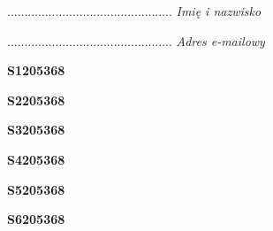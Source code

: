 \begin{turn}{90}\begin{minipage}{\linewidth} \vspace{20mm} ................................................  \textit{Imię i nazwisko}\end{minipage}\end{turn}

\begin{turn}{90}\begin{minipage}{\linewidth} \vspace{20mm} ................................................  \textit{Adres e-mailowy}\end{minipage}\end{turn}

\begin{turn}{90}\huge \begin{minipage}{\linewidth} \vspace{10mm}\textbf{S1205368}\end{minipage}\end{turn}

\begin{turn}{90}\huge \begin{minipage}{\linewidth} \vspace{10mm}\textbf{S2205368}\end{minipage}\end{turn}

\begin{turn}{90}\huge \begin{minipage}{\linewidth} \vspace{10mm}\textbf{S3205368}\end{minipage}\end{turn}

\begin{turn}{90}\huge \begin{minipage}{\linewidth} \vspace{10mm}\textbf{S4205368}\end{minipage}\end{turn}

\begin{turn}{90}\huge \begin{minipage}{\linewidth} \vspace{10mm}\textbf{S5205368}\end{minipage}\end{turn}

\begin{turn}{90}\huge \begin{minipage}{\linewidth} \vspace{10mm}\textbf{S6205368}\end{minipage}\end{turn}


